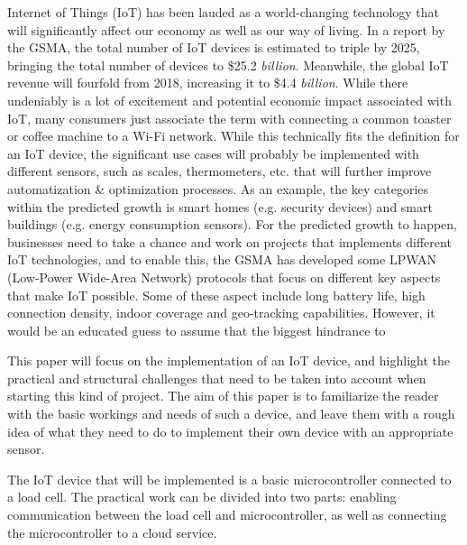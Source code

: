 
Internet of Things (IoT) has been lauded as a world-changing technology that will significantly affect our economy as well as our way of living. In a report by the GSMA, the total number of IoT devices is estimated to triple by 2025, bringing the total number of devices to \$25.2 \textit{billion}. Meanwhile, the global IoT revenue will fourfold from 2018, increasing it to \$4.4 \textit{billion}.\cite{gsma-report} While there undeniably is a lot of excitement and potential economic impact associated with IoT, many consumers just associate the term with connecting a common toaster or coffee machine to a Wi-Fi network. While this technically fits the definition for an IoT device\cite{what_is_iot}, the significant use cases will probably be implemented with different sensors, such as scales, thermometers, etc. that will further improve automatization \& optimization processes. As an example, the key categories within the predicted growth is smart homes (e.g. security devices) and smart buildings (e.g. energy consumption sensors).\cite{gsma-report} For the predicted growth to happen, businesses need to take a chance and work on projects that implements different IoT technologies, and to enable this, the GSMA has developed some LPWAN (Low-Power Wide-Area Network) protocols that focus on different key aspects that make IoT possible. Some of these aspect include long battery life, high connection density, indoor coverage and geo-tracking capabilities. However, it would be an educated guess to assume that the biggest hindrance to 

This paper will focus on the implementation of an IoT device, and highlight the practical and structural challenges that need to be taken into account when starting this kind of project. The aim of this paper is to familiarize the reader with the basic workings and needs of such a device, and leave them with a rough idea of what they need to do to implement their own device with an appropriate sensor. 

The IoT device that will be implemented is a basic microcontroller connected to a load cell. The practical work can be divided into two parts: enabling communication between the load cell and microcontroller, as well as connecting the microcontroller to a cloud service.

